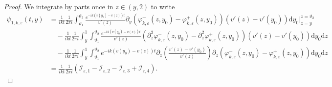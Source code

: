 \documentclass[11pt,reqno]{amsproc}
\theoremstyle{definition}
\numberwithin{equation}{section}
\newcommand{\cI}{{\mathcal I}}
\renewcommand{\d}{\mathrm{d}}
\newcommand{\ep}{\varepsilon}
\begin{document}
\begin{proof}
We integrate by parts once in $z\in (y,2)$ to write
\begin{align*}
\psi_{1,k,\ep}(t,y) &= \frac{1}{ikt}\frac{1}{2\pi i}\int_{\vartheta_1}^{\vartheta_2} \frac{e^{-ik(v(y_0)-v(z)) t}}{v'(z)} \partial_y \left( \varphi_{k,\ep}^-(z,y_0) - \varphi_{k,\ep}^+(z,y_0) \right) (v'(z) - v'(y_0) ) \d y_0 \Big|_{z=y}^{z=\vartheta_2} \\
&\quad -\frac{1}{ikt}\frac{1}{2\pi i}\int_y^1 \int_{\vartheta_1}^{\vartheta_2} \frac{e^{-ik(v(y_0)-v(z))t}}{v'(z)} \left( \partial_z^2\varphi_{k,\ep}^-(z,y_0) - \partial_z^2\varphi_{k,\ep}^+(z,y_0) \right) (v'(z) - v'(y_0))\d y_0 \d z \\
&\quad - \frac{1}{ikt}\frac{1}{2\pi i}\int_y^1 \int_{\vartheta_1}^{\vartheta_2} e^{-ik(v(y_0)-v(z))t} \partial_z \left( \frac{v'(z) - v'(y_0)}{v'(z)} \right) \partial_z\left( \varphi_{k,\ep}^-(z,y_0) - \varphi_{k,\ep}^+(z,y_0) \right) \d y_0 \d z \\
&= \frac{1}{ikt}\frac{1}{2\pi i}\left(  \cI_{\ep,1} - \cI_{\ep,2} - \cI_{\ep,3} + \cI_{\ep,4} \right).
\end{align*}


\end{proof}
\end{document}
